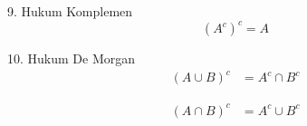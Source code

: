 \documentclass{article}
\begin{document}
9. Hukum Komplemen
\[
(A^c)^c = A
\]
\begin{figure}[H]
    \centering
\end{figure} 
10. Hukum De Morgan
\begin{align*}
(A \cup B)^c &= A^c \cap B^c 
\end{align*}
\begin{figure}[H]
    \centering
\end{figure} 
\begin{align*}
(A \cap B)^c &= A^c \cup B^c
\end{align*}
\begin{figure}[H]
    \centering
\end{figure} 
\end{document}

